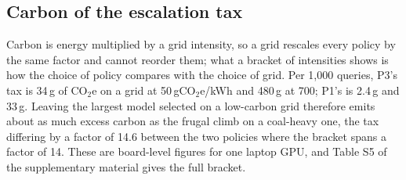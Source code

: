 \subsection{Carbon of the escalation tax}
\label{sec:results-carbon}

Carbon is energy multiplied by a grid intensity, so a grid rescales every
policy by the same factor and cannot reorder them; what a bracket of
intensities shows is how the choice of policy compares with the choice of
grid. Per 1{,}000 queries, P3's tax is 34\,g of CO$_2$e on a grid at
50\,gCO$_2$e/kWh and 480\,g at 700; P1's is 2.4\,g and 33\,g. Leaving the
largest model selected on a low-carbon grid therefore emits about as much
excess carbon as the frugal climb on a coal-heavy one, the tax differing by a
factor of 14.6 between the two policies where the bracket spans a factor of
14. These are board-level figures for one laptop GPU, and Table S5 of the
supplementary material gives the full bracket.
